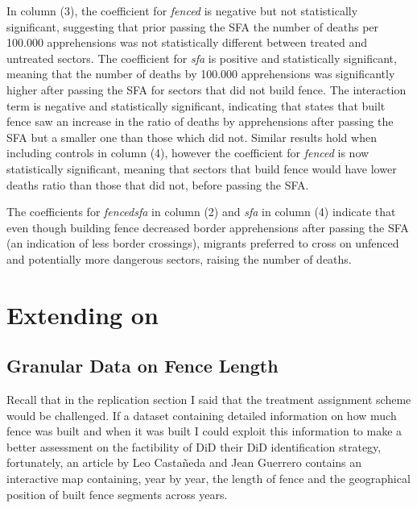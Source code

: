 \documentclass[titlepage]{article}
\theoremstyle{plain}
\theoremstyle{plain}
\begin{document}
In column (3), the coefficient for \textit{fenced} is negative but not statistically significant, suggesting that prior passing the SFA the number of deaths per 100.000 apprehensions was not statistically different between treated and untreated sectors. The coefficient for \textit{sfa} is positive and statistically significant, meaning that the number of deaths by 100.000 apprehensions was significantly higher after passing the SFA for sectors that did not build fence. The interaction term is negative and statistically significant, indicating that states that built fence saw an increase in the ratio of deaths by apprehensions after passing the SFA but a smaller one than those which did not. Similar results hold when including controls in column (4), however the coefficient for \textit{fenced} is now statistically significant, meaning that sectors that build fence would have lower deaths ratio than those that did not, before passing the SFA.

The coefficients for \textit{fencedsfa} in column (2) and \textit{sfa} in column (4) indicate that even though building fence decreased border apprehensions after passing the SFA (an indication of less border crossings), migrants preferred to cross on unfenced and potentially more dangerous sectors, raising the number of deaths.

\section*{Extending on \cite{Bansak2022}}

\subsection*{Granular Data on Fence Length}

Recall that in the replication section I said that the treatment assignment scheme would be challenged. If a dataset containing detailed information on how much fence was built and when it was built I could exploit this information to make a better assessment on the factibility of DiD their DiD identification strategy, fortunately, an article by Leo Castañeda and Jean Guerrero \cite*{castaneda2017} contains an interactive map containing, year by year, the length of fence and the geographical position of built fence segments across years.
\end{document}
